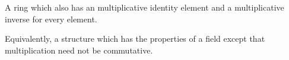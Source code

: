  A ring which also has an multiplicative identity element 
and a multiplicative inverse for every element.
\par
Equivalently, a structure which has the properties of a field
except that multiplication need not be commutative.